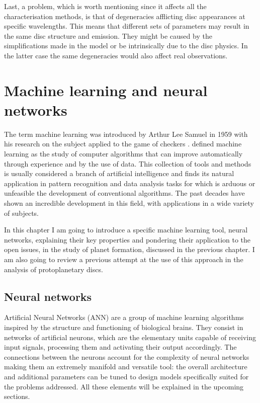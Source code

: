 \documentclass[a4paper,10pt]{report}
\begin{document}
Last, a problem, which is worth mentioning since it affects all the characterisation methods,
is that of degeneracies afflicting disc appearances at specific
wavelengths. This means that different sets of parameters may result in the same disc structure and emission.
They might be caused by the simplifications made in the model or be intrinsically due to the disc physics. 
In the latter case the same degeneracies would also affect real observations.

\chapter{Machine learning and neural networks}

The term machine learning was introduced by Arthur Lee Samuel in 1959
with his research on the subject applied to the game of checkers \citep{ml_checkers}.
\citet{book_ml} defined machine learning as the study of
computer algorithms that can improve automatically through experience and by the use of data.
This collection of tools and methods is usually considered a branch of artificial intelligence and 
finds its natural application in pattern recognition and data analysis tasks for which is arduous or
unfeasible the development of conventional algorithms.
The past decades have shown an incredible development in this field,
with applications in a wide variety of subjects.

In this chapter I am going to introduce a specific machine learning tool, neural networks, explaining
their key properties and pondering their application to the open issues, in the study of planet formation,
discussed in the previous chapter. I am also going to review a previous attempt at the use of this approach in the 
analysis of protoplanetary discs.

\section{Neural networks}

Artificial Neural Networks (ANN) are a group of machine learning algorithms inspired by the structure and functioning 
of biological brains.
They consist in networks of artificial neurons,
which are the elementary units capable of receiving input signals, processing
them and activating their output accordingly. The connections between the neurons account for 
the complexity of neural networks making them an extremely manifold and versatile tool:
the overall architecture and additional parameters can be tuned to design 
models specifically suited for the problems addressed.
All these elements will be explained in the upcoming sections.
\end{document}
